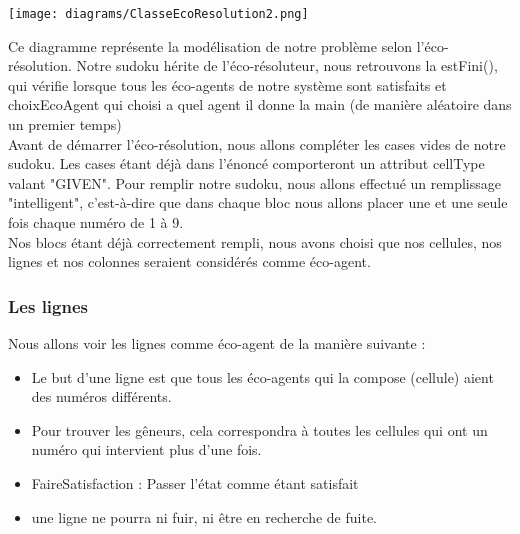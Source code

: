 			\begin{center}
                \texttt{[image: diagrams/ClasseEcoResolution2.png]}
            \end{center} 
            
			Ce diagramme représente la modélisation de notre problème selon l'éco-résolution. Notre sudoku hérite de l'éco-résoluteur, nous retrouvons la estFini(), qui vérifie lorsque tous les éco-agents de notre système sont satisfaits et choixEcoAgent qui choisi a quel agent il donne la main (de manière aléatoire  dans un premier temps)\\			
            Avant de démarrer l'éco-résolution, nous allons compléter les cases vides de notre sudoku. Les cases étant déjà dans l'énoncé comporteront un attribut cellType valant "GIVEN". Pour remplir notre sudoku, nous allons effectué un remplissage "intelligent", c'est-à-dire que dans chaque bloc nous allons placer une et une seule fois chaque numéro de 1 à 9.\\
            Nos blocs étant déjà correctement rempli, nous avons choisi que nos cellules, nos lignes et nos colonnes seraient considérés comme éco-agent. \\
            
            \subsubsection{Les lignes}
                Nous allons voir les lignes comme éco-agent de la manière suivante : \\
                \begin{itemize}
                    \item Le but d'une ligne est que tous les éco-agents qui la compose (cellule) aient des numéros différents.
                    \item Pour trouver les gêneurs, cela correspondra à toutes les cellules qui ont un numéro qui intervient plus d'une fois. 
                    \item FaireSatisfaction : Passer l'état comme étant satisfait
                    \item une ligne ne pourra ni fuir, ni être en recherche de fuite.   
                \end{itemize}
